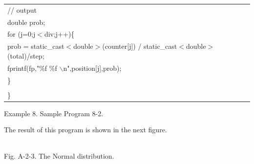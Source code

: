 {\footnotesize
\begin{center}
\begin{tabular}{|l|}\hline
\hspace*{10mm}// output\\
\hspace*{10mm}double prob;\\
\hspace*{10mm}for (j=0;j$<$div;j++)\{\\
\hspace*{20mm}prob = static\_cast$<$double$>$(counter[j]) / static\_cast$<$double$>$(total)/step;\\
\hspace*{20mm}fprintf(fp,"\%f \%f $\backslash$n",position[j],prob);\\
\hspace*{10mm}\}\\
\hspace*{\textwidth}\\
\}\\\hline
\end{tabular}
\vspace*{5mm}

{\small
Example 8. Sample Program 8-2.
}
\end{center}
}

\vspace*{10mm}

\noindent
The result of this program is shown in the next figure.

\vspace*{10mm}

\begin{center}
\\
\vspace*{10mm}
Fig. A-2-3. The Normal distribution.\\
\end{center}

